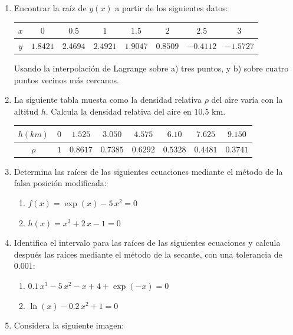 \begin{enumerate}
\begin{enumerate}
\end{enumerate}
\item Encontrar la raíz de $y (x)$ a partir de los siguientes datos:
\begin{table}[H] 
\centering 
\begin{tabular}{c | c | c | c | c | c | c | c |}
$x$ & $0$ & $0.5$ & $1$ & $1.5$ & $2$ & $2.5$ & $3$ \\ \hline
$y$ & $1.8421$ & $2.4694$ & $2.4921$ & $1.9047$ & $0.8509$ & $-0.4112$ & $-1.5727$ 
\end{tabular}
\end{table}
Usando la interpolación de Lagrange sobre a) tres puntos, y b) sobre cuatro puntos vecinos más cercanos.
\item La siguiente tabla muesta como la densidad relativa $\rho$ del aire varía con la altitud $h$. Calcula la densidad relativa del aire en $10.5$ km.
\begin{table}[H]
\centering 
\begin{tabular}{c | c | c | c | c | c | c | c |}
$h (km)$ & $0$ & $1.525$ & $3.050$ & $4.575$ & $6.10$ & $7.625$ & $9.150$ \\ \hline
$\rho$ & $1$ & $0.8617$ & $0.7385$ & $0.6292$ & $0.5328$ & $0.4481$ & $0.3741$ 
\end{tabular}
\end{table}
\item Determina las raíces de las siguientes ecuaciones mediante el método de la falsa posición modificada:
\begin{enumerate}
\renewcommand{\arraystretch}{1.5}
\item $f(x) = \exp(x) - 5 \, x^{2} = 0$
\item $h(x) = x^{3} + 2 \, x - 1 = 0$
\end{enumerate}
\item Identifica el intervalo para las raíces de las siguientes ecuaciones y calcula después las raíces mediante el método de la secante, con una tolerancia de $0.001$:
\begin{enumerate}
\item $0.1 \, x^{3} - 5 \, x^{2} - x + 4 + \exp(-x) = 0$
\item $\ln(x) -0.2 \, x^{2} + 1 = 0$
\end{enumerate}
\item Considera la siguiente imagen:
\begin{figure}[H]
	\centering

\end{figure}
\end{enumerate}
